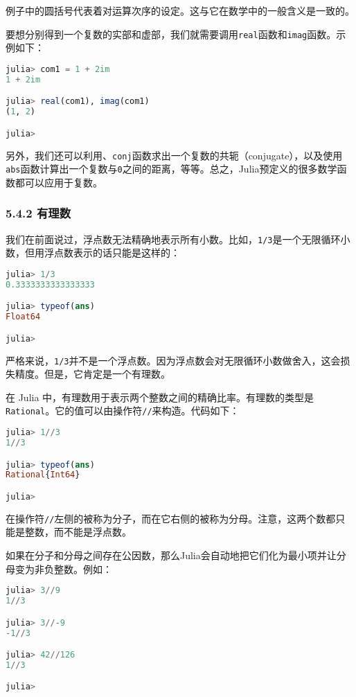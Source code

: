 例子中的圆括号代表着对运算次序的设定。这与它在数学中的一般含义是一致的。

要想分别得到一个复数的实部和虚部，我们就需要调用\verb|real|函数和\verb|imag|函数。示例如下：
\begin{lstlisting}[language=julia]
julia> com1 = 1 + 2im 
1 + 2im

julia> real(com1), imag(com1)
(1, 2)

julia> 
\end{lstlisting}

另外，我们还可以利用、\verb|conj|函数求出一个复数的共轭（conjugate），以及使用\verb|abs|函数计算出一个复数与\verb|0|之间的距离，等等。总之，Julia预定义的很多数学函数都可以应用于复数。

\subsubsection{5.4.2 有理数}

我们在前面说过，浮点数无法精确地表示所有小数。比如，\verb|1/3|是一个无限循环小数，但用浮点数表示的话只能是这样的：
\begin{lstlisting}[language=julia]
julia> 1/3
0.3333333333333333

julia> typeof(ans)
Float64

julia> 
\end{lstlisting}

严格来说，\verb|1/3|并不是一个浮点数。因为浮点数会对无限循环小数做舍入，这会损失精度。但是，它肯定是一个有理数。

在 Julia 中，有理数用于表示两个整数之间的精确比率。有理数的类型是\verb|Rational|。它的值可以由操作符\verb|//|来构造。代码如下：
\begin{lstlisting}[language=julia]
julia> 1//3
1//3

julia> typeof(ans)
Rational{Int64}

julia> 
\end{lstlisting}

在操作符\verb|//|左侧的被称为分子，而在它右侧的被称为分母。注意，这两个数都只能是整数，而不能是浮点数。

如果在分子和分母之间存在公因数，那么Julia会自动地把它们化为最小项并让分母变为非负整数。例如：
\begin{lstlisting}[language=julia]
julia> 3//9
1//3

julia> 3//-9
-1//3

julia> 42//126
1//3

julia> 
\end{lstlisting}

